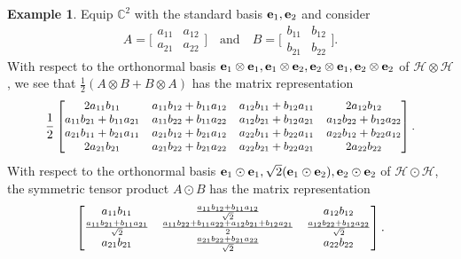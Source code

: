 \documentclass[10pt,reqno]{amsart}
\newcommand{\0}{{\color{lightgray}0}}
\newcommand{\C}{\mathbb{C}}
\newcommand{\h}{\mathcal{H}}
\renewcommand{\vec}[1]{{\bf #1}}
\theoremstyle{definition}
\newtheorem{Example}[equation]{Example}
\numberwithin{equation}{section}
\begin{document}
\begin{Example}
Equip $\C^2$ with the standard basis $\vec{e}_1,\vec{e}_2$ and consider
\begin{equation}\label{eq:A2x2}
A = \big[\begin{smallmatrix}
a_{11} & a_{12} \\
a_{21} & a_{22} 
\end{smallmatrix}\big] \quad \text{and} \quad B = \big[\begin{smallmatrix}
b_{11} & b_{12} \\
b_{21} & b_{22} 
\end{smallmatrix}\big].
\end{equation}
With respect to the orthonormal basis
$\vec{e}_1 \otimes \vec{e}_1,
\vec{e}_1 \otimes \vec{e}_2,
\vec{e}_2 \otimes \vec{e}_1,
\vec{e}_2 \otimes \vec{e}_2$ of $\h\otimes \h$,
we see that $\frac{1}{2} (A \otimes B+B \otimes A)$ has the matrix representation
\begin{equation}\label{eq:2x2Tensor}
\frac{1}{2}\small
\begin{bmatrix}
2 a_{11} b_{11} & a_{11} b_{12} + b_{11} a_{12} & a_{12} b_{11} + b_{12} a_{11} & 2a_{12} b_{12} \\
a_{11} b_{21} + b_{11} a_{21} & a_{11} b_{22} + b_{11} a_{22} & a_{12} b_{21} + b_{12} a_{21} & a_{12} b_{22} + b_{12} a_{22} \\
a_{21} b_{11} + b_{21} a_{11} & a_{21} b_{12} + b_{21} a_{12} & a_{22} b_{11} + b_{22} a_{11} & a_{22} b_{12} + b_{22} a_{12} \\
2a_{21} b_{21} & a_{21} b_{22} + b_{21} a_{22} & a_{22} b_{21} + b_{22} a_{21} & 2a_{22} b_{22} 
\end{bmatrix} .
\end{equation}
With respect to the orthonormal basis $\vec{e}_1 \odot \vec{e}_1, \sqrt{2}(\vec{e}_1 \odot \vec{e}_2), \vec{e}_2 \odot \vec{e}_2$
of $\h \odot \h$, the symmetric tensor product $A \odot B$ has the matrix representation
\begin{equation}\label{eq:2x2to3x3}\small
    \begin{bmatrix}
a_{11}b_{11} &\frac{a_{11} b_{12} + b_{11}a_{12}}{\sqrt{2}} &  a_{12}b_{12} \\
\frac{a_{11} b_{21} + b_{11}a_{21}}{\sqrt{2}}& \frac{a_{11} b_{22} + b_{11}a_{22} + a_{12} b_{21} + b_{12}a_{21}}{2} & \frac{a_{12} b_{22} + b_{12}a_{22}}{\sqrt{2}} \\
a_{21}b_{21}& \frac{a_{21} b_{22} + b_{21}a_{22}}{\sqrt{2}} & a_{22}b_{22}
\end{bmatrix} .
\end{equation}
\end{Example}
\end{document}
